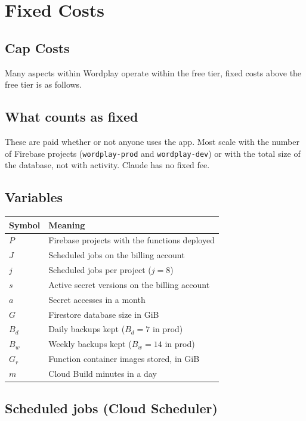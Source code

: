 \documentclass[11pt]{article}
\begin{document}
\section{Fixed Costs}
\subsection{Cap Costs}
Many aspects within Wordplay operate within the free tier, fixed costs above the free tier is as follows. 

\subsection{What counts as fixed}

These are paid whether or not anyone uses the app. Most scale with the number
of Firebase projects (\texttt{wordplay-prod} and \texttt{wordplay-dev}) or with
the total size of the database, not with activity. Claude has no fixed fee.

\subsection{Variables}

\begin{center}
\begin{tabular}{ll}
\toprule
Symbol & Meaning \\
\midrule
$P$ & Firebase projects with the functions deployed \\
$J$ & Scheduled jobs on the billing account \\
$j$ & Scheduled jobs per project ($j = 8$) \\
$s$ & Active secret versions on the billing account \\
$a$ & Secret accesses in a month \\
$G$ & Firestore database size in GiB \\
$B_d$ & Daily backups kept ($B_d = 7$ in prod) \\
$B_w$ & Weekly backups kept ($B_w = 14$ in prod) \\
$G_r$ & Function container images stored, in GiB \\
$m$ & Cloud Build minutes in a day \\
\bottomrule
\end{tabular}
\end{center}

\subsection{Scheduled jobs (Cloud Scheduler)}
\end{document}
